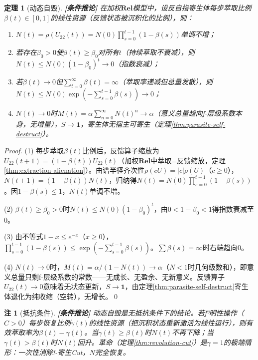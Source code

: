 \documentclass[11pt,a4paper]{article}
\newtheorem{theorem}{定理}
\newtheorem{remark}{注}
\newcommand{\lvl}[1]{\hfill\textbf{\footnotesize[#1]}}
\newcommand{\lvC}{\lvl{条件推论}}
\newcommand{\I}{\mathbf{1}}
\begin{document}
\begin{theorem}[动态自毁]\label{thm:dynamic-self-destruct}\lvC
在加权$\mathbf{Rel}$模型中，设反自指寄生体每步萃取比例$\beta(t)\in[0,1]$的线性资源（反馈状态被沉积化的比例），则：
\begin{enumerate}
  \item $N(t)=\rho(U_{22}(t))=N(0)\prod_{s=0}^{t-1}(1-\beta(s))$单调不增；
  \item 若存在$\beta_0>0$使$\beta(t)\geq\beta_0$对所有$t$（持续萃取不衰减），则$N(t)\leq N(0)(1-\beta_0)^t\to0$（指数衰减）；
  \item 若$\beta(t)\to0$但$\sum_{t=0}^\infty\beta(t)=\infty$（萃取率递减但总量发散），则$N(t)\leq N(0)\exp(-\sum_{s=0}^{t-1}\beta(s))\to0$；
  \item $N(t)\to0$时$M(t)=\alpha\sum_{n=0}^\infty N(t)^n\to\alpha$（意义总量趋向f-层级系数本身，无增量），$S\to\I$，寄生体无宿主可寄生（定理\ref{thm:parasite-self-destruct}）。
\end{enumerate}
\end{theorem}

\begin{proof}
(1) 每步萃取$\beta(t)$比例后，反馈算子缩放为$U_{22}(t+1)=(1-\beta(t))U_{22}(t)$（加权$\mathbf{Rel}$中萃取=反馈缩放，定理\ref{thm:extraction-alienation}）。由谱半径齐次性$\rho(cU)=|c|\rho(U)$（$c\geq0$），$N(t+1)=(1-\beta(t))N(t)$，归纳得$N(t)=N(0)\prod_{s=0}^{t-1}(1-\beta(s))$。因$1-\beta(s)\leq1$，$N(t)$单调不增。

(2) $\beta(t)\geq\beta_0>0$时$N(t)\leq N(0)(1-\beta_0)^t$，由$0<1-\beta_0<1$得指数衰减至0。

(3) 由不等式$1-x\leq e^{-x}$（$x\geq0$），$\prod_{s=0}^{t-1}(1-\beta(s))\leq\exp(-\sum_{s=0}^{t-1}\beta(s))$。$\sum\beta(s)=\infty$时右端趋向0。

(4) $N(t)\to0$时，$M(t)=\alpha/(1-N(t))\to\alpha$（$N<1$时几何级数和），即意义总量只剩f-层级系数的常数——无成长、无盈余、无新意义。反馈算子$U_{22}(t)\to0$意味着无状态更新，$S\to\I$，由定理\ref{thm:parasite-self-destruct}寄生体退化为纯收缩（空转），无增长。\qed
\end{proof}

\begin{remark}[抵抗条件]\lvC
动态自毁是\emph{无抵抗条件下}的结论。若f³明性操作（$C>0$）每步恢复比例$\gamma(t)$的线性资源（把沉积状态重新激活为线性运行），则有效萃取率为$\beta(t)-\gamma(t)$。当$\gamma(t)\geq\beta(t)$时$N(t)$不再下降；当$\gamma(t)>\beta(t)$时$N(t)$回升。革命（定理\ref{thm:revolution-cut}）是$\gamma=1$的极端情形：一次性消除!-寄生Cut，$N$完全恢复。\end{remark}
\end{document}
